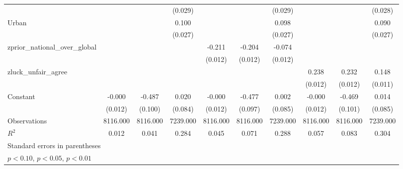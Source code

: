 {\begin{tabular}{l*{9}{c}}
                    &                     &                     &     (0.029)         &                     &                     &     (0.029)         &                     &                     &     (0.028)         \\
\addlinespace
Urban               &                     &                     &       0.100\sym{***}&                     &                     &       0.098\sym{***}&                     &                     &       0.090\sym{***}\\
                    &                     &                     &     (0.027)         &                     &                     &     (0.027)         &                     &                     &     (0.027)         \\
\addlinespace
zprior\_national\_over\_global&                     &                     &                     &      -0.211\sym{***}&      -0.204\sym{***}&      -0.074\sym{***}&                     &                     &                     \\
                    &                     &                     &                     &     (0.012)         &     (0.012)         &     (0.012)         &                     &                     &                     \\
\addlinespace
zluck\_unfair\_agree  &                     &                     &                     &                     &                     &                     &       0.238\sym{***}&       0.232\sym{***}&       0.148\sym{***}\\
                    &                     &                     &                     &                     &                     &                     &     (0.012)         &     (0.012)         &     (0.011)         \\
\addlinespace
Constant            &      -0.000         &      -0.487\sym{***}&       0.020         &      -0.000         &      -0.477\sym{***}&       0.002         &      -0.000         &      -0.469\sym{***}&       0.014         \\
                    &     (0.012)         &     (0.100)         &     (0.084)         &     (0.012)         &     (0.097)         &     (0.085)         &     (0.012)         &     (0.101)         &     (0.085)         \\
\midrule
Observations        &    8116.000         &    8116.000         &    7239.000         &    8116.000         &    8116.000         &    7239.000         &    8116.000         &    8116.000         &    7239.000         \\
\(R^{2}\)           &       0.012         &       0.041         &       0.284         &       0.045         &       0.071         &       0.288         &       0.057         &       0.083         &       0.304         \\
\bottomrule
\multicolumn{10}{l}{\footnotesize Standard errors in parentheses}\\
\multicolumn{10}{l}{\footnotesize \sym{*} \(p<0.10\), \sym{**} \(p<0.05\), \sym{***} \(p<0.01\)}\\
\end{tabular}
}
